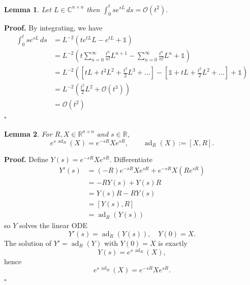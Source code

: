 \documentclass[12pt]{article}
\newcommand{\RR}{\mathds{R}}
\newtheorem{lem}{Lemma}
\DeclareMathOperator{\ad}{ad}
\newenvironment{pf}{\noindent\textbf{Proof.}}{\hfill$\square$}
\begin{document}
\begin{lem}
\label{order_2_METD1}
Let $L \in \mathbb{C}^{n \times n}$ then $\int_0^{t} s e^{sL}\,ds = \mathcal O( t^2).$ 
\end{lem}
\begin{pf}
By integrating, we have
\begin{align*}
        \int_0^{t} s e^{sL}\,ds &= L^{-2}\left( te^{tL}L - e^{tL} + \mathds{1}  \right)\\
        &= L^{-2}\left(t \sum_{n=0}^\infty \frac{t^n}{n!}L^{n+1} - \sum_{n=0}^\infty \frac{t^n}{n!}L^n + \mathds{1} \right)\\
        &=L^{-2}  \left( [tL + t^2L^{2} + \frac{t^3}{2}L^3 + \dots ] - 
        [\mathds{1} + tL + \frac{t^2}{2}L^2 + \dots] + \mathds{1}      \right)
        \\&= L^{-2} \left( \frac{t^2}{2}L^2 +  \mathcal O( t^3)     \right)\\
        &= \mathcal O( t^2)
\end{align*}
\end{pf} 

\begin{lem}
\label{lem:ad_R}
For $R,X\in\RR^{n\times n}$ and $s\in\RR$,
\begin{equation*}
    e^{s\,\ad_R}(X)=e^{-sR}Xe^{sR},
\qquad \ad_R(X):=[X,R].
\end{equation*}
\end{lem}
\begin{pf}
    Define $Y(s) = e^{-sR}Xe^{sR}$. Differentiate
    \begin{align*}
        Y'(s) &= (-R)e^{-sR}Xe^{sR} + e^{-sR}X(Re^{sR})\\
        &=-RY(s) + Y(s)R\\
        &= Y(s)R - RY(s)\\
        &= [Y(s),R] \\
        &= \ad_R(Y(s))
    \end{align*}
    so $Y$ solves the linear ODE
    \begin{equation}
        Y'(s) = \ad_R(Y(s)), \quad Y(0) = X.
    \end{equation}
    The solution of $Y' = \ad_R(Y)$ with $Y(0) = X$ is exactly
    \begin{equation}
        Y(s) = e^{s\,\ad_R}(X),
    \end{equation}
    hence 
    \begin{equation}
        e^{s\,\ad_R}(X) = e^{-sR}Xe^{sR}.
    \end{equation}
\end{pf}
\end{document}
